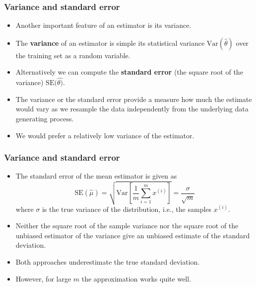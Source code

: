 \documentclass[notes]{beamer}          %
\begin{document}
\begin{frame}
\frametitle{Variance and standard error}
    \begin{itemize}
        \item Another important feature of an estimator is its variance.
        \item The {\bf variance} of an estimator is simple its statistical variance $\mbox{Var}(\hat{\theta})$ over the training set as a random variable.
        \item Alternatively we can compute the {\bf standard error} (the square root of the variance) $\mbox{SE}(\hat{\theta)}$.
        \item The variance or the standard error provide a measure how much the estimate would vary as we resample the data independently from the underlying data generating process.
        \item We would prefer a relatively low variance of the estimator.
    \end{itemize}
\end{frame}


\begin{frame}
\frametitle{Variance and standard error}
    \begin{itemize}
        \item The standard error of the mean estimator is given as
        $$
        \mbox{SE}(\hat{\mu}) = \sqrt{\mbox{Var}\left[\frac{1}{m}\sum_{i=1}^m x^{(i)}\right]} = \frac{\sigma}{\sqrt{m}}
        $$
        where $\sigma$ is the true variance of the distribution, i.e., the samples $x^{(i)}$.
        \item Neither the square root of the sample variance nor the square root of the unbiased estimator of the variance give an unbiased estimate of the standard deviation.
        \item Both approaches underestimate the true standard deviation.
        \item However, for large $m$ the approximation works quite well.
    \end{itemize}
\end{frame}
\end{document}
